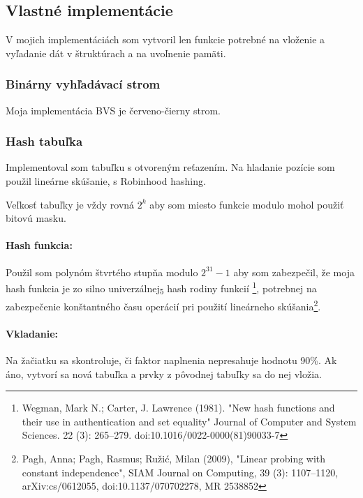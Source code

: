 \documentclass[a4paper,slovak,12pt]{article}
\begin{document}
    \subsection{Vlastné implementácie}\label{subsec:vlastne-implementacie}

    V mojich implementáciách som vytvoril len funkcie potrebné na vloženie a vyľadanie dát v štruktúrach a na
    uvoľnenie pamäti.

    \subsubsection{Binárny vyhľadávací strom}\label{subsubsec:cerveno-cierny-strom}

    Moja implementácia BVS je červeno-čierny strom.

    \subsubsection{Hash tabuľka}\label{subsubsec:hash-tabulka-s-retazenim}

    Implementoval som tabuľku s otvoreným reťazením.
    Na hladanie pozície som použil lineárne skúšanie, s Robinhood hashing.

    Veľkosť tabuľky je vždy rovná $2^k$ aby som miesto funkcie modulo mohol použiť bitovú masku.

    \paragraph{Hash funkcia:}
    Použil som polynóm štvrtého stupňa modulo $2^{31}-1$ aby som zabezpečil, že moja hash funkcia je zo
    silno univerzálnej\textsubscript{5} hash rodiny funkcií
    \footnote{Wegman, Mark N.; Carter, J. Lawrence (1981). "New hash functions and their
    use in authentication and set equality"  Journal of Computer and System Sciences. 22 (3): 265–279. doi:10.1016/0022-0000(81)90033-7},
    potrebnej na zabezpečenie konštantného času operácií pri použití lineárneho skúšania\footnote{Pagh, Anna; Pagh, Rasmus; Ružić, Milan (2009),
        "Linear probing with constant independence",
        SIAM Journal on Computing, 39 (3): 1107–1120, arXiv:cs/0612055, doi:10.1137/070702278, MR 2538852}.\hfill

    \paragraph{Vkladanie:}
    Na žačiatku sa skontroluje, či faktor naplnenia nepresahuje hodnotu 90\%.
    Ak áno, vytvorí sa nová tabuľka a prvky z pôvodnej tabuľky sa do nej vložia.
\end{document}
